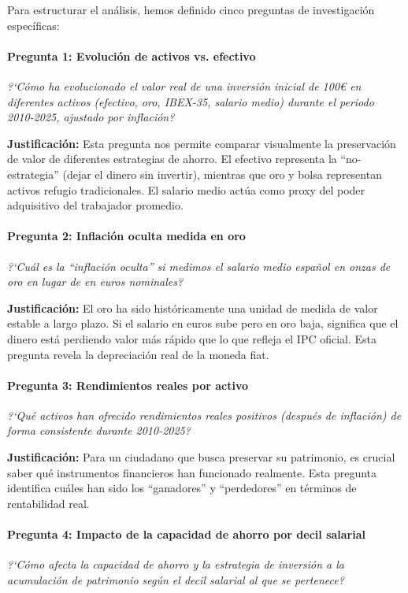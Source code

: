 \documentclass{article}
\begin{document}
Para estructurar el an\'alisis, hemos definido cinco preguntas de investigaci\'on espec\'ificas:

\paragraph{Pregunta 1: Evoluci\'on de activos vs. efectivo}
\textit{?`C\'omo ha evolucionado el valor real de una inversi\'on inicial de 100\euro{} en diferentes activos (efectivo, oro, IBEX-35, salario medio) durante el periodo 2010-2025, ajustado por inflaci\'on?}

\textbf{Justificaci\'on:} Esta pregunta nos permite comparar visualmente la preservaci\'on de valor de diferentes estrategias de ahorro. El efectivo representa la ``no-estrategia'' (dejar el dinero sin invertir), mientras que oro y bolsa representan activos refugio tradicionales. El salario medio act\'ua como proxy del poder adquisitivo del trabajador promedio.


\paragraph{Pregunta 2: Inflaci\'on oculta medida en oro}
\textit{?`Cu\'al es la ``inflaci\'on oculta'' si medimos el salario medio espa\~nol en onzas de oro en lugar de en euros nominales?}

\textbf{Justificaci\'on:} El oro ha sido hist\'oricamente una unidad de medida de valor estable a largo plazo. Si el salario en euros sube pero en oro baja, significa que el dinero est\'a perdiendo valor m\'as r\'apido que lo que refleja el IPC oficial. Esta pregunta revela la depreciaci\'on real de la moneda fiat.

\paragraph{Pregunta 3: Rendimientos reales por activo}
\textit{?`Qu\'e activos han ofrecido rendimientos reales positivos (despu\'es de inflaci\'on) de forma consistente durante 2010-2025?}

\textbf{Justificaci\'on:} Para un ciudadano que busca preservar su patrimonio, es crucial saber qu\'e instrumentos financieros han funcionado realmente. Esta pregunta identifica cu\'ales han sido los ``ganadores'' y ``perdedores'' en t\'erminos de rentabilidad real.

\paragraph{Pregunta 4: Impacto de la capacidad de ahorro por decil salarial}
\textit{?`C\'omo afecta la capacidad de ahorro y la estrategia de inversi\'on a la acumulaci\'on de patrimonio seg\'un el decil salarial al que se pertenece?}
\end{document}
